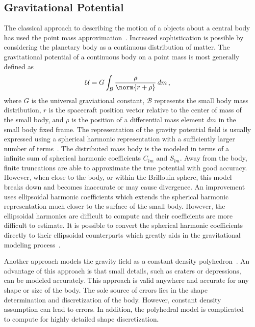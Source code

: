 \documentclass[11pt]{article} %
\begin{document}
\subsection{Gravitational Potential}
The classical approach to describing the motion of a objects about a central body has used the point mass approximation~\cite{vallado2001,bate1971}.
Increased sophistication is possible by considering the planetary body as a continuous distribution of matter. 
The gravitational potential of a continuous body on a point mass is most generally defined as 
\begin{equation*}
	\mathcal{U} = G \int_\mathcal{B} \frac{\rho}{\norm{r + \rho}} \, dm \, ,
\end{equation*}
where \( G \) is the universal graviational constant, \( \mathcal{B} \) represents the small body mass distribution, \( r \) is the spacecraft position vector relative to the center of mass of the small body, and \( \rho \) is the position of a differential mass element \( dm \) in the small body fixed frame.
The representation of the gravity potential field is usually expressed using a spherical harmonic representation with a sufficiently larger number of terms~\cite{scheeres2012}.
The distributed mass body is the modeled in terms of a infinite sum of spherical harmonic coefficients \( C_{lm} \) and \( S_{lm} \).
Away from the body, finite truncations are able to approximate the true potential with good accuracy.
However, when close to the body, or within the Brillouin sphere, this model breaks down and becomes inaccurate or may cause divergence. 
An improvement uses ellipsoidal harmonic coefficients which extends the spherical harmonic representation much closer to the surface of the small body.
However, the ellipsoidal harmonics are difficult to compute and their coefficients are more difficult to estimate.
It is possible to convert the spherical harmonic coefficients directly to their ellipsoidal counterparts which greatly aids in the gravitational modeling process~\cite{dechambre2002}.

Another approach models the gravity field as a constant density polyhedron~\cite{werner1996}.
An advantage of this approach is that small details, such as craters or depressions, can be modeled accurately.
This approach is valid anywhere and accurate for any shape or size of the body. 
The sole source of errors lies in the shape determination and discretization of the body.
However, constant density assumption can lead to errors. 
In addition, the polyhedral model is complicated to compute for highly detailed shape discretization.
\end{document}
